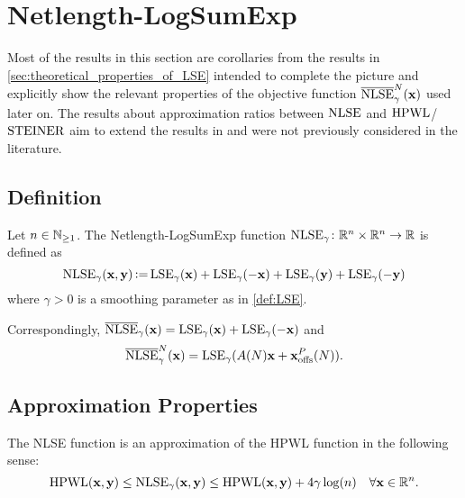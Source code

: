\section{Netlength-LogSumExp} \label{sec:theoretical_properties_of_NLSE}

Most of the results in this section are corollaries from the results in \cref{sec:theoretical_properties_of_LSE}
intended to complete the picture and
explicitly show the relevant properties of the objective function \(\overline{\operatorname{NLSE}}_{\gamma}^N(\mathbf{x})\) used later on.
The results about approximation ratios between \(\operatorname{NLSE}\) and \(\operatorname{HPWL}\)/\(\operatorname{STEINER}\)
aim to extend the results in \cite{BrennerVygen-WorstCaseRatiosOfNetworksInTheRectilinearPlane}
and were not previously considered in the literature.


\subsection{Definition} \label{sec:NLSE_definition}

\begin{definition} \label{def:NLSE}
 Let \(n \in \mathbb{N}_{\geq 1}\). The Netlength-LogSumExp function \(\operatorname{NLSE}_\gamma \colon \mathbb{R}^n \times \mathbb{R}^n \to \mathbb{R}\) is defined as
 \[ \operatorname{NLSE}_{\gamma}(\mathbf{x}, \mathbf{y}) \operatorname{\vcentcolon=} \operatorname{LSE}_{\gamma}(\mathbf{x}) + \operatorname{LSE}_{\gamma}(-\mathbf{x}) + \operatorname{LSE}_{\gamma}(\mathbf{y}) + \operatorname{LSE}_{\gamma}(-\mathbf{y}) \]
 where \(\gamma > 0\) is a smoothing parameter as in \cref{def:LSE}.
\end{definition}


\begin{remark}
 Correspondingly, \(\overline{\operatorname{NLSE}}_{\gamma}(\mathbf{x}) = \operatorname{LSE}_{\gamma}(\mathbf{x}) + \operatorname{LSE}_{\gamma}(-\mathbf{x})\) and
 \[ \overline{\operatorname{NLSE}}_{\gamma}^N(\mathbf{x}) = \operatorname{LSE}_{\gamma}(A(N) \mathbf{x} + \mathbf{x}_{\operatorname{offs}}^P(N)). \]
\end{remark}



\subsection{Approximation Properties} \label{sec:NLSE_approximation_properties}

\begin{corollary} \label{thm:NLSE_approximates_HPWL}
 The NLSE function is an approximation of the HPWL function in the following sense:
 \[ \operatorname{HPWL} (\mathbf{x}, \mathbf{y}) \leq \operatorname{NLSE}_{\gamma}(\mathbf{x}, \mathbf{y}) \leq \operatorname{HPWL} (\mathbf{x}, \mathbf{y}) + 4 \gamma \log(n) \quad \forall \mathbf{x} \in \mathbb{R}^n .\]
\end{corollary}

